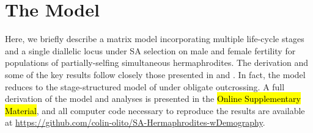 \documentclass[11pt,draft]{article}
\begin{document}




\section*{The Model}

Here, we briefly describe a matrix model incorporating multiple life-cycle stages and a single diallelic locus under SA selection on male and female fertility for populations of partially-selfing simultaneous hermaphrodites. The derivation and some of the key results follow closely those presented in \citet{deVriesCaswell2019a} and \citet{deVriesCaswell2019b}. In fact, the model reduces to the stage-structured model of \citet{deVriesCaswell2019a} under obligate outcrossing. A full derivation of the model and analyses is presented in the \hl{Online Supplementary Material}, and all computer code necessary to reproduce the results are available at \url{https://github.com/colin-olito/SA-Hermaphrodites-wDemography}.
\end{document}
